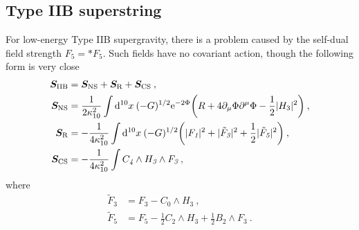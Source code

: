 \subsection*{Type IIB superstring}

For low-energy Type IIB supergravity, there is a problem caused by the self-dual field strength $F_{\textit{5}}=\ast F_{\textit{5}}$. Such fields have no covariant action, though the following form is very close
\begin{subequations}
	\begin{align}
		\bm{S}_{\text{IIB}}&=\bm{S}_{\text{NS}}+\bm{S}_{\text{R}}+\bm{S}_{\text{CS}} \:, \label{12.1.26a} \\
		\bm{S}_{\text{NS}}&=\frac{1}{2\kappa_{10}^{2}}\int\mathrm{d}^{10}x\:(-G)^{1/2}\mathrm{e}^{-2\Phi}
		\biggl(R+4\partial_{\mu}\Phi\partial^{\mu}\Phi-\frac{1}{2}\lvert H_{3}\rvert^{2}\biggr) \:,\label{12.1.26b} \\
		\bm{S}_{\text{R}}&=- \frac{1}{4\kappa_{10}^{2}} \int \mathrm{d}^{10}x\:(-G)^{1/2}\biggl(\lvert F_{\textit{1}}\rvert^{2}+\lvert\tilde{F}_{\textit{3}}\rvert^{2}+\frac{1}{2}\lvert\tilde{F}_{\textit{5}}\rvert^{2}\biggr) \:, \label{12.1.26c} \\
		\bm{S}_{\text{CS}}&=-\frac{1}{4\kappa_{10}^{2}}\int C_{\textit{4}}\wedge H_{\textit{3}}\wedge F_{\textit{3}} \:,
	\end{align}
\end{subequations}
where
\begin{subequations}
	\begin{align}
		\tilde{F}_{\textit{3}} &= F_{\textit{3}}- C_{\textit{0}}\wedge H_{\textit{3}} \:, \label{12.1.27a}\\
		\tilde{F}_{\textit{5}} &= F_{\textit{5}} -\frac{1}{2}C_{\textit{2}}\wedge H_{\textit{3}} +\frac{1}{2}B_{\textit{2}}\wedge F_{\textit{3}} \:. \label{12.1.27b}
	\end{align}
\end{subequations}
